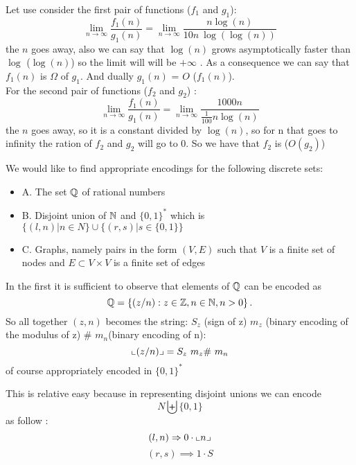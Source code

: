\begin{solution}
	Let use consider the first pair of functions ($f_1$ and $g_1$):
	\[
		\lim_{n\to\infty} \frac{f_1(n)}{g_1(n)}=\lim_{n\to\infty} \frac{ n \log(n)}{10 n\ \log (\log (n))}
	\]
	the $n$ goes away, also we can say that $\log(n)$ grows asymptotically faster than $\log$ ($\log(n)$) so the limit will will be  \(+\infty\) . As a consequence we can say that $f_1(n)$ is \(\Omega\)  of $g_1$. And dually $g_1(n)$ = \(O\) ($f_1(n)$).\\
	For the second pair of functions ($f_2$ and $g_2$) :
	\[\lim_{n\to\infty} \frac{f_1(n)}{g_1(n)}=\lim_{n\to\infty} \frac{ 1000n}{\frac{1}{100} n \log (n)} \]
	the $n$ goes away, so it is a constant divided by $\log(n)$, so for n that goes to infinity the ration of $f_2$ and $g_2$ will go to $0$. So we have that $f_2$ is ($O(g_2)$)
\end{solution}
\begin{ex}
	We would like to find appropriate encodings for the following discrete sets:
	\begin{itemize}
		\item A. The set $\mathbb{Q}$ of rational numbers
		\item B. Disjoint union of $\mathbb{N}$ and \(\{0,1\}^*\) which is \(\{(l,n) | n\in N\}  \cup \{(r,s) | s \in \{0,1\}\}\)
		\item C. Graphs, namely pairs in the form $(V,E)$ such that $V$ is a finite set of nodes and $E \subset V \times V$ is a finite set of edges
	\end{itemize}
\end{ex}
\begin{solution}[A]
	In the first it is sufficient to observe that elements of $\mathbb{Q}$ can be encoded as
	\[
		\mathbb{Q} = \{ (z/ n) : z \in \mathbb{Z}, n \in \mathbb{N}, n>0\} \, .
	\]
	So all together $(z,n)$ becomes the string: \(S_z\) (sign of z) \(m_z\) (binary encoding of the modulus of z) \(\#\) \(m_n\)(binary encoding of n):
	\[
		\llcorner (z/n) \lrcorner = S_z \ m_z \# \ m_n
	\]
	of course appropriately encoded in \(\{0,1\}^*\)
\end{solution}
\begin{solution}[B]
	This is relative easy because in  representing disjoint unions we can encode
	\[N \biguplus \{0,1\}\]
	as follow :\\
	\[(l,n) \Rightarrow 0 \cdot \llcorner  n \lrcorner \]
	\[(r,s) \implies 1 \cdot S\]
\end{solution}


